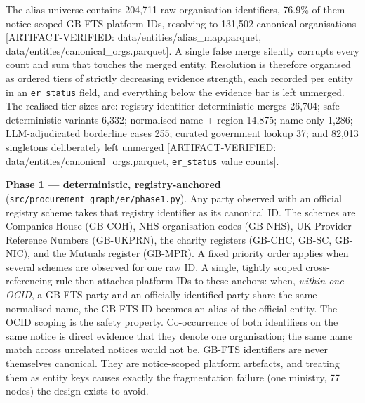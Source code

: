 The alias universe contains 204,711 raw organisation identifiers, 76.9\% of them notice-scoped GB-FTS platform IDs, resolving to 131,502 canonical organisations [ARTIFACT-VERIFIED: data/entities/alias\_map.parquet, data/entities/canonical\_orgs.parquet]. A single false merge silently corrupts every count and sum that touches the merged entity. Resolution is therefore organised as ordered tiers of strictly decreasing evidence strength, each recorded per entity in an \texttt{er\_status} field, and everything below the evidence bar is left unmerged. The realised tier sizes are: registry-identifier deterministic merges 26,704; safe deterministic variants 6,332; normalised name + region 14,875; name-only 1,286; LLM-adjudicated borderline cases 255; curated government lookup 37; and 82,013 singletons deliberately left unmerged [ARTIFACT-VERIFIED: data/entities/canonical\_orgs.parquet, \texttt{er\_status} value counts].

\textbf{Phase 1 --- deterministic, registry-anchored} (\texttt{src/procurement\_graph/er/phase1.py}). Any party observed with an official registry scheme takes that registry identifier as its canonical ID. The schemes are Companies House (GB-COH), NHS organisation codes (GB-NHS), UK Provider Reference Numbers (GB-UKPRN), the charity registers (GB-CHC, GB-SC, GB-NIC), and the Mutuals register (GB-MPR). A fixed priority order applies when several schemes are observed for one raw ID. A single, tightly scoped cross-referencing rule then attaches platform IDs to these anchors: when, \emph{within one OCID}, a GB-FTS party and an officially identified party share the same normalised name, the GB-FTS ID becomes an alias of the official entity. The OCID scoping is the safety property. Co-occurrence of both identifiers on the same notice is direct evidence that they denote one organisation; the same name match across unrelated notices would not be. GB-FTS identifiers are never themselves canonical. They are notice-scoped platform artefacts, and treating them as entity keys causes exactly the fragmentation failure (one ministry, 77 nodes) the design exists to avoid.

